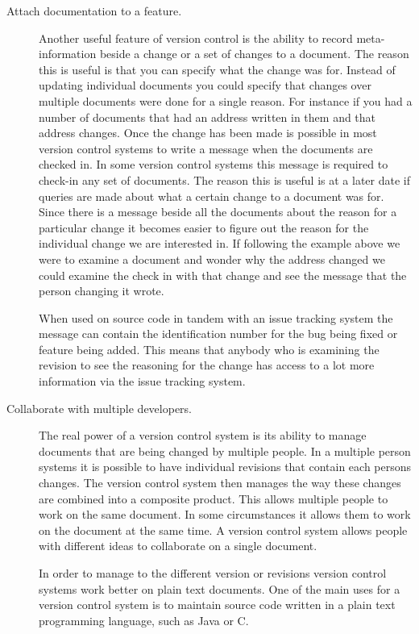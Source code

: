 \begin{description}
  \item [Attach documentation to a feature.]    
  Another useful feature of version control is the ability to record meta-information beside a change or a set of changes to a document.  The reason this is useful is that you can specify what the change was for.  Instead of updating individual documents you could specify that changes over multiple documents were done for a single reason.  For instance if you had a number of documents that had an address written in them and that address changes.  Once the change has been made is possible in most version control systems to write a message when the documents are checked in.  In some version control systems this message is required to check-in any set of documents.  The reason this is useful is at a later date if queries are made about what a certain change to a document was for.  Since there is a message beside all the documents about the reason for a particular change it becomes easier to figure out the reason for the individual change we are interested in. If following the example above we were to examine a document and wonder why the address changed we could examine the check in with that change and see the message that the person changing it wrote.

  When used on source code in tandem with an issue tracking system the message can contain the identification number for the bug being fixed or feature being added.  This means that anybody who is examining the revision to see the reasoning for the change has access to a lot more information via the issue tracking system.


  \item [Collaborate with multiple developers.]
  The real power of a version control system is its ability to manage documents that are being changed by multiple people.  In a multiple person systems it is possible to have individual revisions that contain each persons changes. The version control system then manages the way these changes are combined into a composite product. This allows multiple people to work on the same document. In some circumstances it allows them to work on the document at the same time.   A version control system allows people with different ideas to collaborate on a single document.

  In order to manage to the different version or revisions version control systems work better on plain text documents. One of the main uses for a version control system is to maintain source code written in a plain text programming language, such as Java or C.

\end{description}



